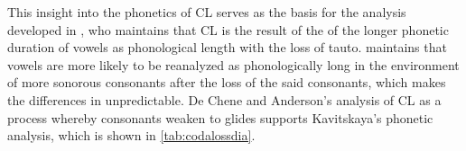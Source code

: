\documentclass[output=paper,
modfonts
]{LSP/langsci}
\begin{document}
This insight into the phonetics of CL serves as the basis for the
analysis developed in \citet{kavitskaya2002}, who maintains that CL is the
result of the  of the longer phonetic duration of vowels as
phonological length with the loss of tauto.
\citet{kavitskaya2002} maintains that vowels are more likely to be reanalyzed
as phonologically long in the environment of more sonorous consonants
after the loss of the said consonants, which makes the differences in
 unpredictable. De Chene and Anderson's \citeyearpar{deChene1979} analysis of
CL as a process whereby consonants weaken to glides supports
Kavitskaya's phonetic analysis, which is shown in \cref{tab:codalossdia}.%
\end{document}
